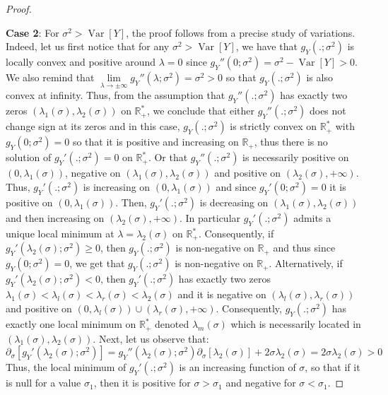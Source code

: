 \documentclass[a4paper, 10pt]{article}
\newcommand{\beq}{\begin{equation}}
\newcommand{\eeq}{\end{equation}}
\theoremstyle{definition}
\begin{document}
\begin{proof}
\begin{itemize}
\end{itemize}
\textbf{Case 2}: For $\sigma^2 > \operatorname{Var}[Y]$, the proof follows from a precise study of variations. Indeed, let us first notice that for any $\sigma^2>\operatorname{Var}[Y]$, we have that $g_Y(.;\sigma^2)$ is locally convex and positive around $\lambda=0$ since $g_Y''(0;\sigma^2)=\sigma^2-\operatorname{Var}[Y]>0$. We also remind that $\underset{\lambda\to \pm \infty}{\lim} g_Y''(\lambda;\sigma^2)=\sigma^2>0$ so that $g_Y(.;\sigma^2)$ is also convex at infinity. Thus, from the assumption that $g_Y''(.;\sigma^2)$ has exactly two zeros $(\lambda_1(\sigma),\lambda_2(\sigma))$ on $\mathbb{R}_+^*$, we conclude that either $g_Y''(.;\sigma^2)$ does not change sign at its zeros and in this case, $g_Y(.;\sigma^2)$ is strictly convex on $\mathbb{R}_+^*$ with $g_Y(0;\sigma^2)=0$ so that it is positive and increasing on $\mathbb{R}_+$, thus there is no solution of $g_Y'(.;\sigma^2)=0$ on $\mathbb{R}_+^*$. Or that $g_Y''(.;\sigma^2)$ is necessarily positive on $(0,\lambda_1(\sigma))$, negative on $(\lambda_1(\sigma),\lambda_2(\sigma))$ and positive on $(\lambda_2(\sigma),+\infty)$. Thus, $g_Y'(.;\sigma^2)$ is increasing on $(0,\lambda_1(\sigma))$ and since $g_Y'(0;\sigma^2)=0$ it is positive on $(0,\lambda_1(\sigma))$. Then, $g_Y'(.;\sigma^2)$ is decreasing on $(\lambda_1(\sigma),\lambda_2(\sigma))$ and then increasing on $(\lambda_2(\sigma),+\infty)$. In particular $g_Y'(.;\sigma^2)$ admits a unique local minimum at $\lambda=\lambda_2(\sigma)$ on $\mathbb{R}_+^*$. Consequently, if $g_Y'(\lambda_2(\sigma);\sigma^2)\geq 0$, then $g_Y(.;\sigma^2)$ is non-negative on $\mathbb{R}_+$ and thus since $g_Y(0;\sigma^2)=0$, we get that $g_Y(.;\sigma^2)$ is non-negative on $\mathbb{R}_+$. Alternatively, if $g_Y'(\lambda_2(\sigma);\sigma^2)<0$, then $g_Y'(.;\sigma^2)$ has exactly two zeros $\lambda_1(\sigma)<\lambda_l(\sigma)<\lambda_r(\sigma)<\lambda_2(\sigma)$ and it is negative on $(\lambda_l(\sigma),\lambda_r(\sigma))$ and positive on $(0,\lambda_l(\sigma))\cup(\lambda_r(\sigma),+\infty)$. Consequently, $g_Y(.;\sigma^2)$ has exactly one local minimum on $\mathbb{R}_+^*$ denoted $\lambda_m(\sigma)$ which is necessarily located in  $(\lambda_1(\sigma),\lambda_2(\sigma))$.
Next, let us observe that:
\beq \partial_\sigma[g_Y'(\lambda_2(\sigma);\sigma^2)]=g_Y''(\lambda_2(\sigma);\sigma^2) \partial_\sigma[\lambda_2(\sigma)]+ 2\sigma\lambda_2(\sigma)=2\sigma\lambda_2(\sigma)>0\eeq
Thus, the local minimum of $g_Y'(.;\sigma^2)$ is an increasing function of $\sigma$, so that if it is null for a value $\sigma_1$, then it is positive for $\sigma>\sigma_1$ and negative for $\sigma<\sigma_1$.

\end{proof}
\end{document}
